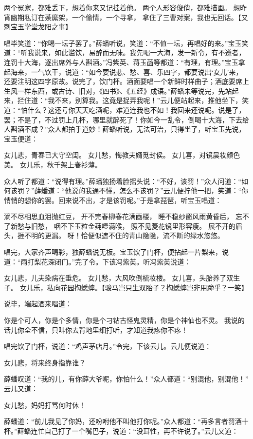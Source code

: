\documentclass[12pt,oneside]{book}
\begin{document}
两个冤家，都难丢下，想着你来又记挂着他。
两个人形容俊俏，都难描画。
想昨宵幽期私订在荼縻架，一个偷情，一个寻拿，
拿住了三曹对案，我也无回话。【又刺宝玉学堂龙阳之事】

唱毕笑道：“你喝一坛子罢了。”薛蟠听说，笑道：“不值一坛，再唱好的来。”宝玉笑道：“听我说来，如此滥饮，易醉而无味。我先喝一大海，发一新令，有不遵者，连罚十大海，逐出席外与人斟酒。”冯紫英、蒋玉菡等都道：“有理，有理。”宝玉拿起海来，一气饮干，说道：“如今要说悲、愁、喜、乐四字，都要说出‘女儿’来，还要注明这四字原故。说完了，饮门杯。酒面要唱一个新鲜时样曲子；酒底要席上生风一样东西，或古诗、旧对，《四书》、《五经》成语。”薛蟠未等说完，先站起来，拦住道：“我不来，别算我。这竟是捉弄我呢！”云儿便站起来，推他坐下，笑道：“怕什么？这还亏你天天吃酒呢，难道连我也不如！我回来还说呢。说是了，罢；不是了，不过罚上几杯，哪里就醉死了！你如今一乱令，倒喝十大海，下去给人斟酒不成？”众人都拍手道妙！薛蟠听说，无法可治，只得坐了，听宝玉先说，宝玉便道：

女儿悲，青春已大守空闺。
女儿愁，悔教夫婿觅封侯。
女儿喜，对镜晨妆颜色美。
女儿乐，秋千架上春衫薄。

众人听了都道：“说得有理。”薛蟠独扬着脸摇头说：“不好，该罚！”众人问道：“如何该罚？”薛蟠道：“他说的我通不懂，怎么不该罚？”云儿便拧他一把，笑道：“你悄悄的想你的罢。回来说不出，才是该罚呢。”于是拿琵琶，听宝玉唱道：

滴不尽相思血泪抛红豆，
开不完春柳春花满画楼，
睡不稳纱窗风雨黄昏后，
忘不了新愁与旧愁，
咽不下玉粒金莼噎满喉，
照不见菱花镜里形容瘦。
展不开的眉头，捱不明的更漏。
呀！恰便似遮不住的青山隐隐，流不断的绿水悠悠。

唱完，大家齐声喝彩，独薛蟠说无板。宝玉饮了门杯，便拈起一片梨来，说道：“雨打梨花深闭门。”完了令。下该冯紫英。听冯紫英说道：

女儿悲，儿夫染病在垂危。
女儿愁，大风吹倒梳妆楼。
女儿喜，头胎养了双生子。
女儿乐，私向花园掏蟋蟀。【骏马岂只生双胎子？掏蟋蟀岂非用蹄乎？一笑】

说毕，端起酒来唱道：

你是个可人，你是个多情，你是个刁钻古怪鬼灵精，你是个神仙也不灵。
我说的话儿你全不信，只叫你去背地里细打听，才知道我疼你不疼！

唱完饮了门杯，说道：“鸡声茅店月。”令完，下该云儿。云儿便说道：

女儿悲，将来终身指靠谁？

薛蟠叹道：“我的儿，有你薛大爷呢，你怕什么！”众人都道：“别混他，别混他！”
云儿又道：

女儿愁，妈妈打骂何时休！

薛蟠道：“前儿我见了你妈，还吩咐他不叫他打你呢。”众人都道：“再多言者罚酒十杯。”薛蟠连忙自己打了一个嘴巴子，说道：“没耳性，再不许说了。”云儿又道：
\end{document}
